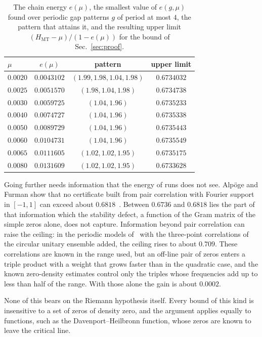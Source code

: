 \documentclass[aps,prd,twocolumn,superscriptaddress,nofootinbib,longbibliography,floatfix,showkeys,amsmath,amssymb,10pt]{revtex4-2}
\theoremstyle{definition}
\theoremstyle{remark}
\newcommand{\MT}{\mathrm{MT}}
\begin{document}
\begin{table}[t]
\caption{The chain energy $e(\mu)$, the smallest value of $e(g,\mu)$ found
over periodic gap patterns $g$ of period at most $4$, the pattern that
attains it, and the resulting upper limit $(H_\MT-\mu)/(1-e(\mu))$ for the
bound of Sec.~\ref{sec:proof}.}
\label{tab:chain}
\begin{tabular}{@{}lccc@{}}
\toprule
$\mu$ & $e(\mu)$ & pattern & upper limit\\
\midrule
$0.0020$ & $0.0043102$ & $(1.99,1.98,1.04,1.98)$ & $0.6734032$\\
$0.0025$ & $0.0051570$ & $(1.98,1.04,1.98)$ & $0.6734738$\\
$0.0030$ & $0.0059725$ & $(1.04,1.96)$ & $0.6735233$\\
$0.0040$ & $0.0074727$ & $(1.04,1.96)$ & $0.6735338$\\
$0.0050$ & $0.0089729$ & $(1.04,1.96)$ & $0.6735443$\\
$0.0060$ & $0.0104731$ & $(1.04,1.96)$ & $0.6735549$\\
$0.0065$ & $0.0111605$ & $(1.02,1.02,1.95)$ & $0.6735175$\\
$0.0080$ & $0.0131609$ & $(1.02,1.02,1.95)$ & $0.6733628$\\
\bottomrule
\end{tabular}
\end{table}

Going further needs information that the energy of runs does not see.
Alp\"oge and Furman show that no certificate built from pair correlation
with Fourier support in $[-1,1]$ can exceed about
$0.6818$~\cite[\S7.2]{AF26}. Between $0.6736$ and $0.6818$ lies the part of
that information which the stability defect, a function of the Gram matrix
of the simple zeros alone, does not capture. Information beyond pair
correlation can raise the ceiling: in the periodic models of~\cite[\S7.2]{AF26}
with the three-point correlations of the circular unitary ensemble added,
the ceiling rises to about $0.709$. These correlations are known in the
range used, but an off-line pair of zeros enters a triple product with a
weight that grows faster than in the quadratic case, and the known
zero-density estimates control only the triples whose frequencies add up to
less than half of the range. With those alone the gain is about $0.0002$.

None of this bears on the Riemann hypothesis itself. Every bound of this
kind is insensitive to a set of zeros of density zero, and the
argument applies equally to functions, such as the Davenport--Heilbronn
function, whose zeros are known to leave the critical line.
\end{document}
